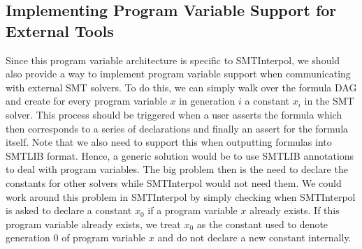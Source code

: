 \documentclass[a4paper,12pt]{article}
\newcommand\si{SMTInterpol\xspace}
\begin{document}
\subsection{Implementing Program Variable Support for External Tools}
Since this program variable architecture is specific to \si, we should also provide a way to implement program variable support when communicating with external SMT solvers.
To do this, we can simply walk over the formula DAG and create for every program variable $x$ in generation $i$ a constant $x_i$ in the SMT solver.
This process should be triggered when a user asserts the formula which then corresponds to a series of declarations and finally an assert for the formula itself.
Note that we also need to support this when outputting formulas into SMTLIB format.
Hence, a generic solution would be to use SMTLIB annotations to deal with program variables.
The big problem then is the need to declare the constants for other solvers while \si would not need them.
We could work around this problem in \si by simply checking when \si is asked to declare a constant $x_0$ if a program variable $x$ already exists.
If this program variable already exists, we treat $x_0$ as the constant used to denote generation 0 of program variable $x$ and do not declare a new constant internally.
\end{document}
